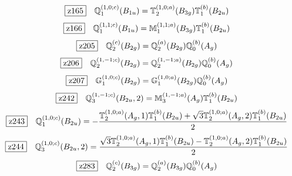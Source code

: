 \documentclass[fleqn,10pt,landscape]{jsarticle}
\begin{document}
\begin{dmath*}
\hspace*{3mm}\fbox{z165}\quad \mathbb{Q}_{1}^{(1,0;c)}(B_{1u})=\mathbb{T}_{2}^{(1,0;a)}(B_{3g}) \mathbb{T}_{1}^{(b)}(B_{2u})
\end{dmath*}
\begin{dmath*}
\hspace*{3mm}\fbox{z166}\quad \mathbb{Q}_{1}^{(1,1;c)}(B_{1u})=\mathbb{M}_{1}^{(1,1;a)}(B_{3g}) \mathbb{T}_{1}^{(b)}(B_{2u})
\end{dmath*}
\begin{dmath*}
\hspace*{3mm}\fbox{z205}\quad \mathbb{Q}_{2}^{(c)}(B_{2g})=\mathbb{Q}_{2}^{(a)}(B_{2g}) \mathbb{Q}_{0}^{(b)}(A_{g})
\end{dmath*}
\begin{dmath*}
\hspace*{3mm}\fbox{z206}\quad \mathbb{Q}_{2}^{(1,-1;c)}(B_{2g})=\mathbb{Q}_{2}^{(1,-1;a)}(B_{2g}) \mathbb{Q}_{0}^{(b)}(A_{g})
\end{dmath*}
\begin{dmath*}
\hspace*{3mm}\fbox{z207}\quad \mathbb{G}_{1}^{(1,0;c)}(B_{2g})=\mathbb{G}_{1}^{(1,0;a)}(B_{2g}) \mathbb{Q}_{0}^{(b)}(A_{g})
\end{dmath*}
\begin{dmath*}
\hspace*{3mm}\fbox{z242}\quad \mathbb{Q}_{3}^{(1,-1;c)}(B_{2u},2)=\mathbb{M}_{3}^{(1,-1;a)}(A_{g}) \mathbb{T}_{1}^{(b)}(B_{2u})
\end{dmath*}
\begin{dmath*}
\hspace*{3mm}\fbox{z243}\quad \mathbb{Q}_{1}^{(1,0;c)}(B_{2u})=- \frac{\mathbb{T}_{2}^{(1,0;a)}(A_{g},1) \mathbb{T}_{1}^{(b)}(B_{2u}) + \sqrt{3} \mathbb{T}_{2}^{(1,0;a)}(A_{g},2) \mathbb{T}_{1}^{(b)}(B_{2u})}{2}
\end{dmath*}
\begin{dmath*}
\hspace*{3mm}\fbox{z244}\quad \mathbb{Q}_{3}^{(1,0;c)}(B_{2u},2)=\frac{\sqrt{3} \mathbb{T}_{2}^{(1,0;a)}(A_{g},1) \mathbb{T}_{1}^{(b)}(B_{2u}) - \mathbb{T}_{2}^{(1,0;a)}(A_{g},2) \mathbb{T}_{1}^{(b)}(B_{2u})}{2}
\end{dmath*}
\begin{dmath*}
\hspace*{3mm}\fbox{z283}\quad \mathbb{Q}_{2}^{(c)}(B_{3g})=\mathbb{Q}_{2}^{(a)}(B_{3g}) \mathbb{Q}_{0}^{(b)}(A_{g})
\end{dmath*}
\end{document}
